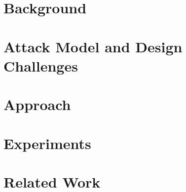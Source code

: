 \section{Background}


\section{Attack Model and Design Challenges}


\section{Approach}


\section{Experiments}


% 

\section{Related Work}








